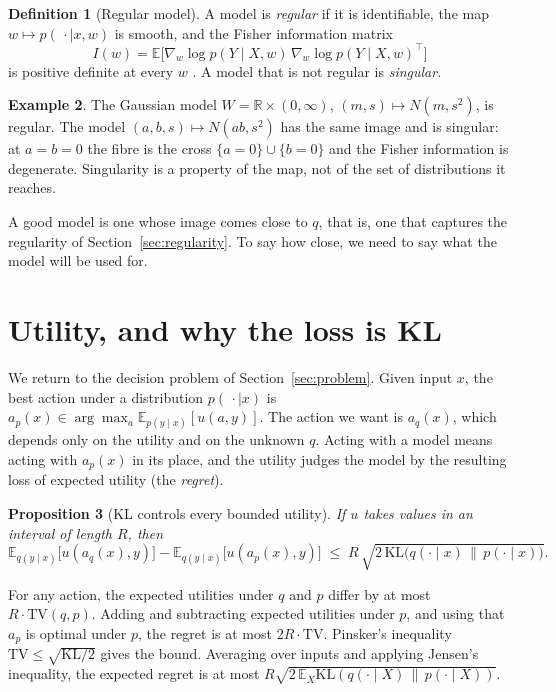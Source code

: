 \documentclass[11pt]{article}
\theoremstyle{definition}
\newtheorem{definition}{Definition}[section]
\newtheorem{example}[definition]{Example}
\theoremstyle{plain}
\newtheorem{proposition}[definition]{Proposition}
\theoremstyle{remark}
\newcommand{\W}{W}
\newcommand{\E}{\mathbb{E}}
\newcommand{\KL}{\mathrm{KL}}
\newcommand{\TV}{\mathrm{TV}}
\newcommand{\R}{\mathbb{R}}
\begin{document}
\begin{definition}[Regular model]
A model is \emph{regular} if it is identifiable, the map
$w\mapsto p(\,\cdot\mid x,w)$ is smooth, and the Fisher information
matrix
\[
I(w) = \E\big[\nabla_w \log p(Y\mid X,w)\,\nabla_w \log p(Y\mid X,w)^{\top}\big]
\]
is positive definite at every $w$ \cite{watanabe2009}. A model that is
not regular is \emph{singular}.
\end{definition}

\begin{example}
The Gaussian model $\W=\R\times(0,\infty)$, $(m,s)\mapsto N(m,s^2)$, is
regular. The model $(a,b,s)\mapsto N(ab,s^2)$ has the same image and is
singular: at $a=b=0$ the fibre is the cross $\{a=0\}\cup\{b=0\}$ and
the Fisher information is degenerate. Singularity is a property of the
map, not of the set of distributions it reaches.
\end{example}

A good model is one whose image comes close to $q$, that is, one that
captures the regularity of Section~\ref{sec:regularity}. To say how
close, we need to say what the model will be used for.

\section{Utility, and why the loss is KL}\label{sec:utility}

We return to the decision problem of Section~\ref{sec:problem}. Given
input $x$, the best action under a distribution $p(\,\cdot\mid x)$ is
$a_p(x) \in \arg\max_{a} \E_{p(y\mid x)}[u(a,y)]$.
The action we want is $a_q(x)$, which depends only on the utility and
on the unknown $q$. Acting with a model means acting with $a_p(x)$ in
its place, and the utility judges the model by the resulting loss of
expected utility (the \emph{regret}).

\begin{proposition}[KL controls every bounded utility]\label{prop:regret}
If $u$ takes values in an interval of length $R$, then
\[
\E_{q(y\mid x)}\big[u(a_q(x),y)\big] - \E_{q(y\mid x)}\big[u(a_p(x),y)\big]
\;\le\; R\,\sqrt{2\,\KL\big(q(\cdot\mid x)\,\|\,p(\cdot\mid x)\big)} .
\]
\end{proposition}
\noindent For any action, the expected utilities under $q$ and $p$
differ by at most $R\cdot\TV(q,p)$. Adding and subtracting expected
utilities under $p$, and using that $a_p$ is optimal under $p$, the
regret is at most $2R\cdot\TV$. Pinsker's inequality
$\TV\le\sqrt{\KL/2}$ \cite{cover2006} gives the bound. Averaging over
inputs and applying Jensen's inequality, the expected regret is at most
$R\sqrt{2\,\E_X \KL(q(\cdot\mid X)\,\|\,p(\cdot\mid X))}$.
\end{document}
